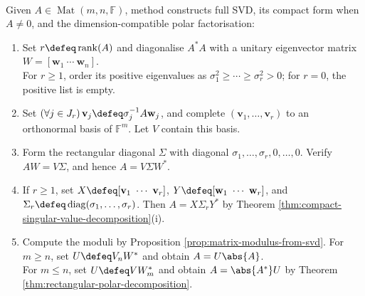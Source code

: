 \begin{computationmethod} \label{meth:svd-polar-computation} \\
Given $A\in\operatorname{Mat}(m,n,\mathbb{F})$, method constructs full SVD, its compact form when $A\neq0$, and the dimension-compatible polar factorisation:
\begin{enumerate}[label=(\roman*)]
\setlength{\itemsep}{0pt}
\item Set $r\defeq\operatorname{rank}(A)$ and diagonalise $A^*A$ with a unitary eigenvector matrix $W=[\mathbf{w}_1\ \cdots\ \mathbf{w}_n]$.\\
For $r\geq1$, order its positive eigenvalues as $\sigma_1^2\geq\cdots\geq\sigma_r^2>0$; for $r=0$, the positive list is empty.
\item Set $(\forall j\in J_r)\,\mathbf{v}_j\defeq\sigma_j^{-1}A\mathbf{w}_j$, and complete $(\mathbf{v}_1,\ldots,\mathbf{v}_r)$ to an orthonormal basis of $\mathbb{F}^m$. Let $V$ contain this basis.
\item Form the rectangular diagonal $\Sigma$ with diagonal $\sigma_1,\ldots,\sigma_r,0,\ldots,0$. Verify $AW=V\Sigma$, and hence $A=V\Sigma W^*$.
\item If $r\geq1$, set $X\defeq[\mathbf{v}_1\ \cdots\ \mathbf{v}_r]$, $Y\defeq[\mathbf{w}_1\ \cdots\ \mathbf{w}_r]$, and $\Sigma_r\defeq\operatorname{diag}(\sigma_1,\ldots,\sigma_r)$. Then $A=X\Sigma_rY^*$ by Theorem \ref{thm:compact-singular-value-decomposition}(i).
\item Compute the moduli by Proposition \ref{prop:matrix-modulus-from-svd}. For $m\geq n$, set $U\defeq V_nW^*$ and obtain $A=U\abs{A}$.\\
For $m\leq n$, set $U\defeq VW_m^*$ and obtain $A=\abs{A^*}U$ by Theorem \ref{thm:rectangular-polar-decomposition}.
\end{enumerate}
\end{computationmethod}

